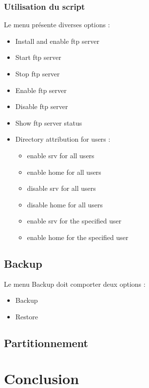 \documentclass{article}
\begin{document}
	\subsubsection{Utilisation du script}
	
	Le menu présente diverses options :
	\begin{itemize}
		\item Install and enable ftp server
		\item Start ftp server 
		\item Stop ftp server
		\item Enable ftp server
		\item Disable ftp server 
		\item Show ftp server status
		\item Directory attribution for users :
		\begin{itemize}
			\item enable srv for all users
			\item enable home for all users
			\item  disable srv for all users
			\item disable home for all users
			\item enable srv for the specified user
			\item enable home for the specified user
		\end{itemize}
	\end{itemize}
	
	\newpage
	
	\subsection{Backup}
	Le menu Backup doit comporter deux options :
	\begin{itemize}
		\item Backup
		\item Restore
	\end{itemize}
	
	\newpage
	
	\subsection{Partitionnement}
	
	\newpage
	\section{Conclusion}
\end{document}
